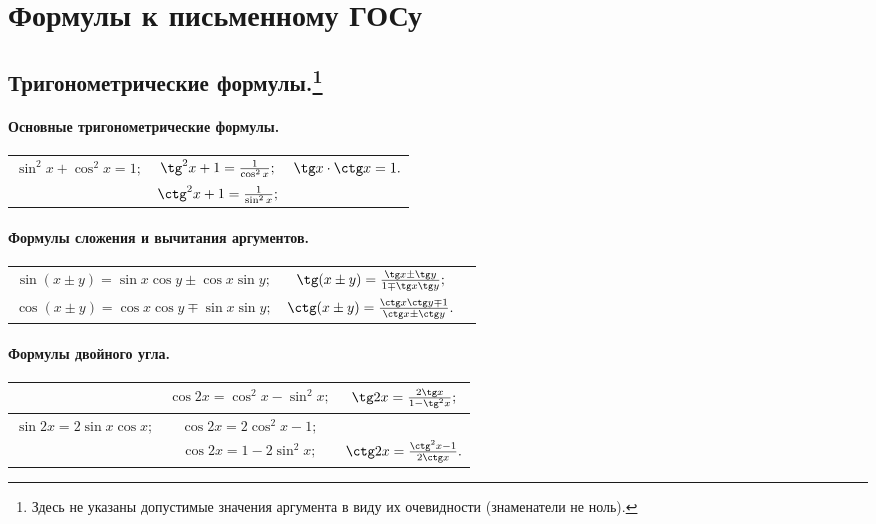 \titleformat{\chapter}[display]{\raggedright\normalfont\Large\bfseries}{\chaptertitlename\ \thechapter}{2ex}{}



\everymath{\displaystyle}

\chapter{Формулы к письменному ГОСу}

\section[Тригонометрические формулы.]{Тригонометрические формулы.\footnote{Здесь не указаны допустимые значения аргумента в виду их очевидности (знаменатели не ноль).}}
\subsubsection{Основные тригонометрические формулы.}
\renewcommand*{\arraystretch}{2}
\noindent\begin{tabular}{ c c c }
\multirow{2}{*}{$\sin^2x+\cos^2x=1;$}
&
$\tg^2x+1=\frac{1}{\cos^2x};$
&
\multirow{2}{*}{$\tg x\cdot\ctg x=1.$}
\\
&
$\ctg^2x+1=\frac{1}{\sin^2x};$
&
\end{tabular}
\subsubsection{Формулы сложения и вычитания аргументов.}
\noindent\begin{tabular}{ c c c}
$\sin(x\pm y)=\sin x \cos y \pm \cos x \sin y;$
&
$\tg(x\pm y)=\frac{\tg x \pm \tg y}{1 \mp \tg x\tg y};$
\\
$\cos(x\pm y)= \cos x \cos y \mp \sin x \sin y;$
&
$\ctg(x\pm y)=\frac{\ctg x\ctg y \mp 1}{\ctg x \pm \ctg y}.$
\end{tabular}
\subsubsection{Формулы двойного угла.}
\noindent\begin{tabular}{ |c |c |c| }
&
$\cos 2x = \cos^2 x - \sin^2 x;$
&
\multirow{1}{*}{$\tg 2x = \frac{2\tg x}{1-\tg^2x};$}
\\\hline
$\sin 2x = 2\sin x \cos x;$
&
$\cos 2x = 2\cos^2 x - 1; $
&
\\\hline
&
$\cos 2x = 1 - 2\sin^2 x;$
&
$\ctg 2x = \frac{\ctg^2x-1}{2\ctg x}.$
\end{tabular}

